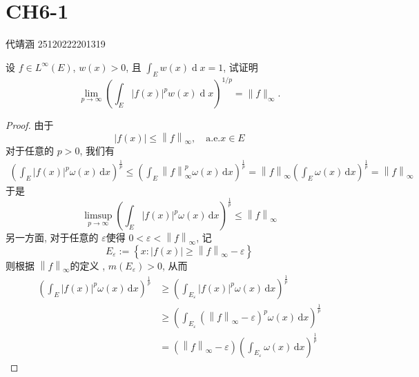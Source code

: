 \documentclass[../main.tex]{subfiles}
\begin{document}
\ifSubfilesClassLoaded{

    
    \setcounter{chapter}{5}
}{}

\chapter{ CH6-1 }
代靖涵 25120222201319
\begin{exercise}{}{}
设 \(f\in L^{\infty}(E)\), \(w(x)>0\), 且 \(\int_{E} w(x)\operatorname{d}x = 1\), 试证明
\[
\lim_{p\to\infty}\left(\int_{E} \lvert f(x)\rvert^{p} w(x)\operatorname{d}x\right)^{1/p} = \lVert f\rVert_{\infty}.
\]
\end{exercise}

\begin{proof}
    由于 \[
    \left| f\left( x \right)  \right|\le \left\| f \right\|_{\infty},\quad \text{a.e.} x\in E 
    \]对于任意的 \(  p > 0  \), 我们有 
    \[
    \begin{aligned}
    \left( \int_{E}\left| f\left( x \right)  \right|^{p} \omega \left( x \right)\,\mathrm{d} x   \right)^{\frac{1}{p}}\le \left(   \int_{E}\left\| f \right\|_{\infty}^{p} \omega \left( x \right)\,\mathrm{d} x   \right) ^{\frac{1}{p}}= \left\| f \right\|_{\infty}\left( \int_{E} \omega \left( x \right)\,\mathrm{d} x  \right)^{\frac{1}{p}}= \left\| f \right\|_{\infty} 
    \end{aligned}
    \]于是 \[
    \limsup_{p\to \infty} \left( \int_{E}\left| f\left( x \right)  \right|^{p} \omega \left( x \right)\,\mathrm{d} x   \right)^{\frac{1}{p}}\le \left\| f \right\|_{\infty} 
    \]另一方面, 对于任意的 \(   \varepsilon   \)使得 \(  0<  \varepsilon < \left\| f \right\|_{\infty}  \),   记 \[
    E_{ \varepsilon }:= \left\{ x: \left| f\left( x \right)  \right|\ge \left\| f \right\|_{\infty}- \varepsilon   \right\}
    \]  则根据 \(  \left\| f \right\|_{\infty}  \)的定义 , \(  m\left( E_{ \varepsilon } \right)> 0   \), 从而\[
    \begin{aligned}
    \left( \int_{E}\left| f\left( x \right)  \right|^{p} \omega \left( x \right)\,\mathrm{d} x   \right)^{\frac{1}{p}}&\ge \left( \int_{E_{ \varepsilon }}\left| f\left( x \right)  \right|^{p} \omega \left( x \right)\,\mathrm{d} x   \right)^{\frac{1}{p}}\\ 
     &\ge   \left(  \int_{E_{ \varepsilon }}\left( \left\| f \right\|_{\infty}- \varepsilon  \right)^{p} \omega \left( x \right)\,\mathrm{d} x \right)^{\frac{1}{p}}\\ 
      &=  \left( \left\| f \right\|_{\infty}- \varepsilon  \right)\left( \int_{E_{ \varepsilon }} \omega \left( x \right)\,\mathrm{d} x  \right)^{\frac{1}{p}}

\end{aligned}\]
\end{proof}
\end{document}
